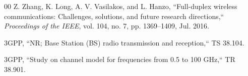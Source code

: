 \documentclass[conference]{IEEEtran}
\begin{document}
\begin{thebibliography}{00}
Z. Zhang, K. Long, A. V. Vasilakos, and L. Hanzo, ``Full-duplex wireless communications: Challenges, solutions, and future research directions,`` \emph{Proceedings of the IEEE}, vol. 104, no. 7, pp. 1369--1409, Jul. 2016.

3GPP, ``NR; Base Station (BS) radio transmission and reception,`` TS 38.104.

3GPP, ``Study on channel model for frequencies from 0.5 to 100 GHz,`` TR 38.901.
\end{thebibliography}
\end{document}
